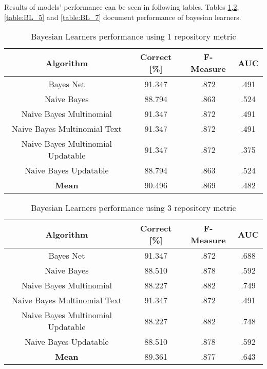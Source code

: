 Results of models' performance can be seen in following tables. Tables \ref{table:BL_1},\ref{table:BL_3}, \ref{table:BL_5} and \ref{table:BL_7} document performance of bayesian learners.


\begin{table}[h!]
\centering
\begin{tabular}{ |c|c|c|c| }
 \hline
 \textbf{Algorithm} & \textbf{Correct [\%]} & \textbf{F-Measure} & \textbf{AUC}  \\
 \hline
 Bayes Net & 91.347 & .872 & .491    \\
 \hline
 Naive Bayes &  88.794 & .863 & .524   \\
 \hline
  Naive Bayes Multinomial & 91.347 & .872 & .491\\
 \hline
  Naive Bayes Multinomial Text & 91.347 & .872 & .491  \\
 \hline
  Naive Bayes Multinomial Updatable & 91.347 & .872 & .375 \\
 \hline
  Naive Bayes Updatable & 88.794 & .863 & .524 \\
 \hline
 \textbf{Mean}  & 90.496 & .869 & .482 \\
 \hline

\end{tabular}
\caption{Bayesian Learners performance using 1 repository metric}
\label{table:BL_1}
\end{table}

\begin{table}[h!]
\centering
\begin{tabular}{ |c|c|c|c| }
 \hline
 \textbf{Algorithm} & \textbf{Correct [\%]} & \textbf{F-Measure} & \textbf{AUC}  \\
 \hline
 Bayes Net & 91.347 & .872 & .688    \\
 \hline
 Naive Bayes &  88.510 & .878 & .592   \\
 \hline
  Naive Bayes Multinomial & 88.227 & .882 & .749\\
 \hline
  Naive Bayes Multinomial Text & 91.347 & .872 & .491  \\
 \hline
  Naive Bayes Multinomial Updatable & 88.227 & .882 & .748 \\
 \hline
  Naive Bayes Updatable & 88.510 & .878 & .592 \\
 \hline
 \textbf{Mean}  & 89.361 & .877 & .643 \\
 \hline

\end{tabular}
\caption{Bayesian Learners performance using 3 repository metric}
\label{table:BL_3}
\end{table}

